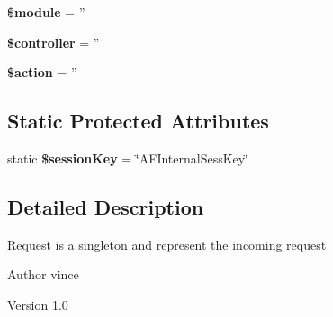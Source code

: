 \begin{DoxyCompactItemize}
\item 
\hypertarget{class_anemo_1_1_application_1_1_http_1_1_request_ac531301c55a8d8b6c7613597218ff482}{
{\bfseries \$module} = ''}
\label{class_anemo_1_1_application_1_1_http_1_1_request_ac531301c55a8d8b6c7613597218ff482}

\item 
\hypertarget{class_anemo_1_1_application_1_1_http_1_1_request_a388ef7b1db5e6f728e63cee704ce6e23}{
{\bfseries \$controller} = ''}
\label{class_anemo_1_1_application_1_1_http_1_1_request_a388ef7b1db5e6f728e63cee704ce6e23}

\item 
\hypertarget{class_anemo_1_1_application_1_1_http_1_1_request_aa698a3e72116e8e778be0e95d908ee30}{
{\bfseries \$action} = ''}
\label{class_anemo_1_1_application_1_1_http_1_1_request_aa698a3e72116e8e778be0e95d908ee30}

\end{DoxyCompactItemize}
\subsection*{Static Protected Attributes}
\begin{DoxyCompactItemize}
\item 
\hypertarget{class_anemo_1_1_application_1_1_http_1_1_request_a60306df197e087e71bad6a3a2eb813d4}{
static {\bfseries \$sessionKey} = \char`\"{}AFInternalSessKey\char`\"{}}
\label{class_anemo_1_1_application_1_1_http_1_1_request_a60306df197e087e71bad6a3a2eb813d4}

\end{DoxyCompactItemize}


\subsection{Detailed Description}
\hyperlink{class_anemo_1_1_application_1_1_http_1_1_request}{Request} is a singleton and represent the incoming request \begin{DoxyAuthor}{Author}
vince 
\end{DoxyAuthor}
\begin{DoxyVersion}{Version}
1.0 
\end{DoxyVersion}



